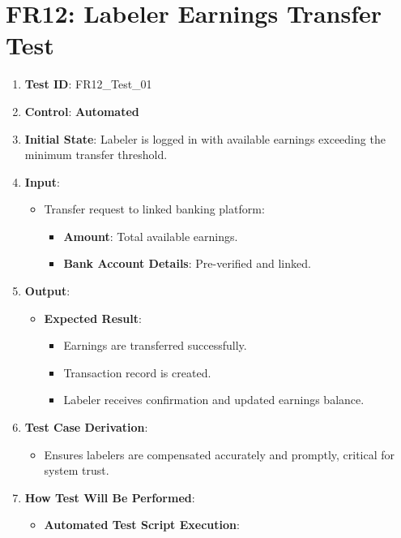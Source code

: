\documentclass[12pt, titlepage]{article}
\begin{document}
\section*{FR12: Labeler Earnings Transfer Test}

\begin{enumerate}
    \item \textbf{Test ID}: FR12\_Test\_01
    \item \textbf{Control}: \textbf{Automated}
    \item \textbf{Initial State}: Labeler is logged in with available earnings exceeding the minimum transfer threshold.
    \item \textbf{Input}:
    \begin{itemize}
        \item Transfer request to linked banking platform:
        \begin{itemize}
            \item \textbf{Amount}: Total available earnings.
            \item \textbf{Bank Account Details}: Pre-verified and linked.
        \end{itemize}
    \end{itemize}
    \item \textbf{Output}:
    \begin{itemize}
        \item \textbf{Expected Result}:
        \begin{itemize}
            \item Earnings are transferred successfully.
            \item Transaction record is created.
            \item Labeler receives confirmation and updated earnings balance.
        \end{itemize}
    \end{itemize}
    \item \textbf{Test Case Derivation}:
    \begin{itemize}
        \item Ensures labelers are compensated accurately and promptly, critical for system trust.
    \end{itemize}
    \item \textbf{How Test Will Be Performed}:
    \begin{itemize}
        \item \textbf{Automated Test Script Execution}:
        \begin{enumerate}

\end{enumerate}
\end{itemize}
\end{enumerate}
\end{document}
